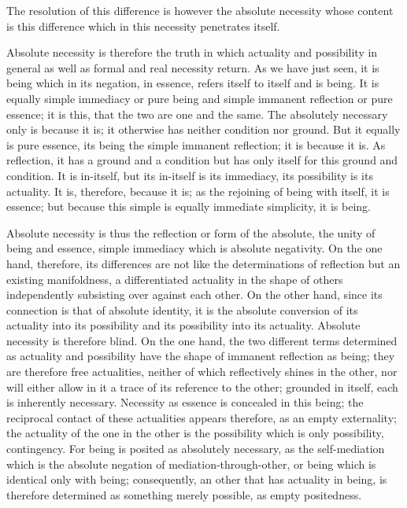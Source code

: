 The resolution of this difference is
however the absolute necessity
whose content is this difference
which in this necessity penetrates itself.

Absolute necessity is therefore the truth
in which actuality and possibility
in general as well as formal and real necessity return.
As we have just seen, it is being which in its negation,
in essence, refers itself to itself and is being.
It is equally simple immediacy or pure being
and simple immanent reflection or pure essence;
it is this, that the two are one and the same.
The absolutely necessary only is because it is;
it otherwise has neither condition nor ground.
But it equally is pure essence,
its being the simple immanent reflection;
it is because it is.
As reflection, it has a ground and a condition
but has only itself for this ground and condition.
It is in-itself, but its in-itself is its immediacy,
its possibility is its actuality.
It is, therefore, because it is;
as the rejoining of being with itself,
it is essence;
but because this simple is equally immediate simplicity,
it is being.

Absolute necessity is thus the reflection or form of the absolute,
the unity of being and essence,
simple immediacy which is absolute negativity.
On the one hand, therefore, its differences are not like the determinations
of reflection but an existing manifoldness, a differentiated actuality in the
shape of others independently subsisting over against each other.
On the other hand, since its connection is that of absolute identity,
it is the absolute conversion of its actuality into its possibility
and its possibility into its actuality.
Absolute necessity is therefore blind.
On the one hand, the two different terms
determined as actuality and possibility have
the shape of immanent reflection as being;
they are therefore free actualities,
neither of which reflectively shines in the other,
nor will either allow in it a trace of its reference to the other;
grounded in itself, each is inherently necessary.
Necessity as essence is concealed in this being;
the reciprocal contact of these actualities appears
therefore, as an empty externality;
the actuality of the one in the other is
the possibility which is only possibility, contingency.
For being is posited as absolutely necessary,
as the self-mediation which is
the absolute negation of mediation-through-other,
or being which is identical only with being;
consequently, an other that has actuality in being,
is therefore determined as something merely possible,
as empty positedness.

